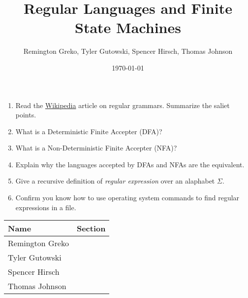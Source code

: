 \documentclass{article}
\begin{document}
\title{Regular Languages and Finite State Machines}
\author{Remington Greko, Tyler Gutowski, Spencer Hirsch, Thomas Johnson}
\date{\today}

\maketitle

\begin{enumerate}
    \item Read the \href{https://en.wikipedia.org/wiki/Regular_grammar}{Wikipedia} article on regular grammars. Summarize
            the saliet points.

    \medskip


    \medskip

    \item What is a Deterministic Finite Accepter (DFA)?
    
    \medskip


    \medskip

    \item What is a Non-Deterministic Finite Accepter (NFA)?
    
    \medskip


    \medskip

    \item Explain why the languages accepted by DFAs and NFAs are the equivalent.
    
    \medskip


    \medskip

    \item Give a recursive definition of \textit{regular expression} over
            an alaphabet $\Sigma$.

    \medskip


    \medskip

    \item Confirm you know how to use operating system commands to find
            regular expressions in a file.

    \medskip


    \medskip
\end{enumerate}

\pagebreak

\begin{center}
    \begin{tabular}{|p{3cm}|p{6cm}|}
        \hline
        \textbf{Name} & \textbf{Section} \\
        \hline
        Remington Greko &  \\
        \hline
        Tyler Gutowski &  \\
        \hline
        Spencer Hirsch &  \\
        \hline
        Thomas Johnson &  \\
        \hline
    \end{tabular}
\end{center}
\end{document}

